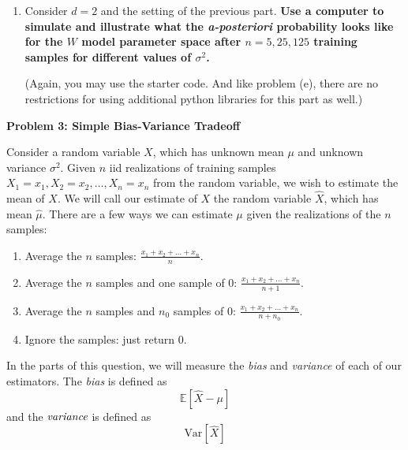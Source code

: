 \documentclass{article}\usepackage[utf8]{inputenc}\usepackage[margin=0.4cm,top=0.4cm,bottom=0.4cm]{geometry}\usepackage[usenames,dvipsnames,svgnames,table]{xcolor}
\begin{document}
\begin{enumerate}
\EndSolution
\item Consider $d=2$ and the setting of the previous part. {\bf Use a computer to simulate and illustrate what the {\em a-posteriori} probability looks like for the $W$ model parameter space after $n=5, 25, 125$ training samples for different values of $\sigma^2$. } 
\vspace{4pt}

\noindent (Again, you may use the starter code. And like problem (e), there are no restrictions for using additional python libraries for this part as well.)  
\BeginSolution

\EndSolution
\end{enumerate}
\clearpage

\vspace{-2mm}\noindent\begin{mybox}{\begin{center}\textbf{\color{black}Problem 3: Simple Bias-Variance Tradeoff}\end{center}}\end{mybox}\vspace{-2mm}
\vspace{10pt}
\noindent Consider a random variable $X$, which has unknown mean $\mu$ and unknown variance $\sigma^2$. Given $n$ iid realizations of training samples $X_1=x_1, X_2=x_2, \ldots, X_n=x_n$ from the random variable, we wish to estimate the mean of $X$. We will call our estimate of $X$ the random variable $\hat{X}$, which has mean $\hat{\mu}$. There are a few ways we can estimate $\mu$ given the realizations of the $n$ samples:
\begin{enumerate}[1.]\item Average the $n$ samples: $\displaystyle \frac{x_1+x_2+\ldots+x_n}{n}$.\item Average the $n$ samples and one sample of $0$: $\displaystyle\frac{x_1+x_2+\ldots+x_n}{n+1}$.\item Average the $n$ samples and $n_0$ samples of $0$: $\displaystyle\frac{x_1+x_2+\ldots+x_n}{n+n_0}$.\item Ignore the samples: just return $0$.\end{enumerate} \noindent In the parts of this question, we will measure the \emph{bias} and \emph{variance} of each of our estimators. The \emph{bias} is defined as $$\mathbb{E}[\hat{X} - \mu]$$ and the $\emph{variance}$ is defined as $$\text{Var}[\hat{X}]$$
\end{document}
